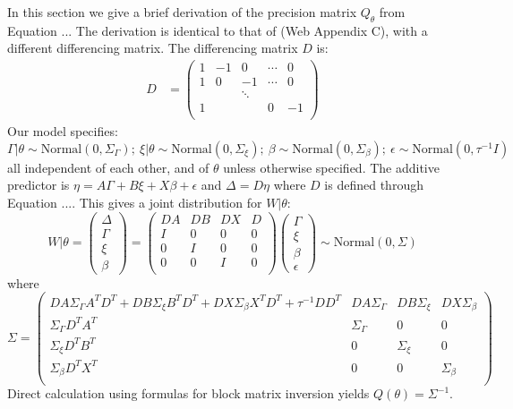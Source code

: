 \documentclass[]{article}
\begin{document}
In this section we give a brief derivation of the precision matrix $Q_{\theta}$ from Equation ... The derivation is identical to that of \citet{casecross} (Web Appendix C), with a different differencing matrix. The differencing matrix $D$ is:
\begin{equation}\begin{aligned}\label{eqn:D2}
D &= \begin{pmatrix}
1 & -1 & 0 & \cdots & 0 \\
1 & 0 & -1 & \cdots & 0 \\
  &    & \ddots &   &   \\
1 &    &       & 0 & -1 \\
\end{pmatrix}
\end{aligned}\end{equation}
Our model specifies:
\begin{equation*}
\Gamma|\theta \sim \text{Normal}\left( 0,\Sigma_{\Gamma}\right); \ \xi|\theta \sim \text{Normal}\left( 0,\Sigma_{\xi}\right); \ \beta \sim \text{Normal}\left( 0,\Sigma_{\beta}\right); \ \epsilon \sim \text{Normal}\left( 0,\tau^{-1}I\right)
\end{equation*}
all independent of each other, and of $\theta$ unless otherwise specified. The additive predictor is $\eta = A\Gamma + B\xi + X\beta + \epsilon$ and $\Delta = D\eta$ where $D$ is defined through Equation .... This gives a joint distribution for $W|\theta$:
\begin{equation*}
W|\theta = \begin{pmatrix} \Delta \\ \Gamma \\ \xi \\\beta \end{pmatrix} = \begin{pmatrix} DA & DB & DX & D \\ I & 0 & 0 & 0 \\ 0 & I & 0 & 0 \\ 0 & 0 & I & 0 \\ \end{pmatrix}\begin{pmatrix}\Gamma\\ \xi \\ \beta \\ \epsilon \end{pmatrix} 
\sim \text{Normal}\left( 0,\Sigma\right)
\end{equation*}
where
\begin{equation*}
\Sigma = \begin{pmatrix}
DA\Sigma_{\Gamma}A^{T}D^{T} + DB\Sigma_{\xi}B^{T}D^{T} + DX\Sigma_{\beta}X^{T}D^{T} + \tau^{-1}DD^{T} & DA\Sigma_{\Gamma} & DB\Sigma_{\xi} & DX\Sigma_{\beta} \\
\Sigma_{\Gamma}D^{T}A^{T} & \Sigma_{\Gamma} & 0 & 0 \\
\Sigma_{\xi}D^{T}B^{T} & 0 & \Sigma_{\xi} & 0 \\
\Sigma_{\beta}D^{T}X^{T} & 0 & 0 & \Sigma_{\beta} \\
\end{pmatrix}
\end{equation*}
Direct calculation using formulas for block matrix inversion yields $Q(\theta) = \Sigma^{-1}$.
\end{document}
